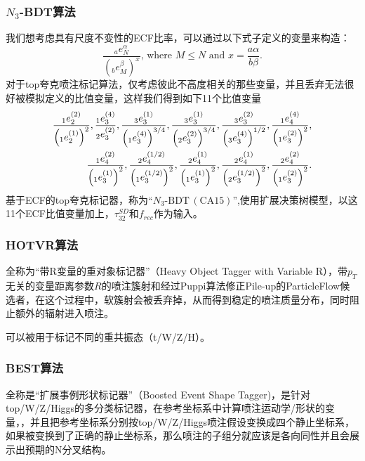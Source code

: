 \subsubsection{$N_3$-BDT算法}
我们想考虑具有尺度不变性的ECF比率，可以通过以下式子定义的变量来构造：
\begin{equation}
    \frac{{}_{a}e_{N}^{\alpha}}{(_{b}e_{M}^{\beta})^{x}}\text{, where }M\leq N%
\text{ and }x=\frac{a\alpha}{b\beta}.
\end{equation}
对于top夸克喷注标记算法，仅考虑彼此不高度相关的那些变量，并且丢弃无法很好被模拟定义的比值变量，这样我们得到如下11个比值变量
\begin{equation}
\begin{split}
\displaystyle\frac{{}_{1}e_{2}^{(2)}}{\Bigl{(}{}_{1}e_{2}^{(1)}\Bigr{)}^{2}},%
\frac{{}_{1}e_{3}^{(4)}}{{}_{2}e_{3}^{(2)}},\frac{{}_{3}e_{3}^{(1)}}{\Bigl{(}{%
}_{1}e_{3}^{(4)}\Bigr{)}^{3/4}},\displaystyle\frac{{}_{3}e_{3}^{(1)}}{\Bigl{(}{}_{2}e_{3}^{(2)}\Bigr{)}^{3/4}}%
,\frac{{}_{3}e_{3}^{(2)}}{\Bigl{(}{}_{3}e_{3}^{(4)}\Bigr{)}^{1/2}},
\displaystyle\frac{{}_{1}e_{4}^{(4)}}{\Bigl{(}{}_{1}e_{3}^{(2)}\Bigr{)}^{2}},\\
\frac{{}_{1}e_{4}^{(2)}}{\Bigl{(}{}_{1}e_{3}^{(1)}\Bigr{)}^{2}},\frac{{}_{2}e_%
{4}^{(1/2)}}{\Bigl{(}{}_{1}e_{3}^{(1/2)}\Bigr{)}^{2}},\displaystyle\frac{{}_{2}e_{4}^{(1)}}{\Bigl{(}{}_{1}e_{3}^{(1)}\Bigr{)}^{2}},%
\frac{{}_{2}e_{4}^{(1)}}{\Bigl{(}{}_{2}e_{3}^{(1/2)}\Bigr{)}^{2}},\frac{{}_{2}%
e_{4}^{(2)}}{\Bigl{(}{}_{1}e_{3}^{(2)}\Bigr{)}^{2}}.
\end{split}
\end{equation}
基于ECF的top夸克标记器，称为“$N_{3}\text{-}\mathrm{BDT}\,(\mathrm{CA}15)$”,使用扩展决策树模型，以这11个ECF比值变量加上，$\tau^{SD}_{32}\text{和}f_{rec}$作为输入。

\subsubsection{HOTVR算法}
全称为“带R变量的重对象标记器”（Heavy Object Tagger with Variable R），带$p_T$无关的变量距离参数$R$的喷注簇射和经过Puppi算法修正Pile-up的ParticleFlow候选者，在这个过程中，软簇射会被丢弃掉，从而得到稳定的喷注质量分布，同时阻止额外的辐射进入喷注。

可以被用于标记不同的重共振态（t/W/Z/H）。
\subsubsection{BEST算法}
全称是“扩展事例形状标记器”（Boosted Event Shape Tagger)，是针对top/W/Z/Higgs的多分类标记器，在参考坐标系中计算喷注运动学/形状的变量，，并且把参考坐标系分别按top/W/Z/Higgs喷注假设变换成四个静止坐标系，如果被变换到了正确的静止坐标系，那么喷注的子组分就应该是各向同性并且会展示出预期的N分叉结构。

